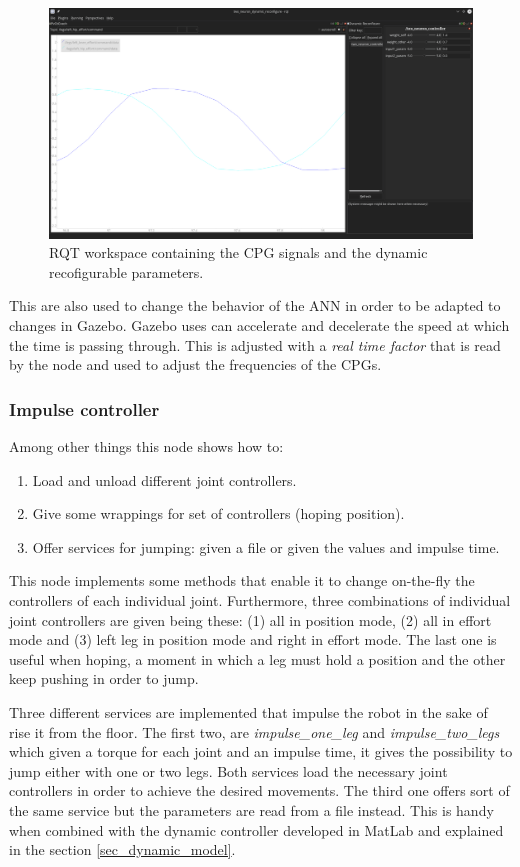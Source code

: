 \begin{figure}[tb]
    \centering
    \includegraphics[width=\textwidth]{figures/rqt_interface}
    \caption{RQT workspace containing the CPG signals and the dynamic recofigurable parameters.}
    \label{fig:rqt_interface}
\end{figure}

This are also used to change the behavior of the ANN in order to be adapted to changes in Gazebo.
Gazebo uses can accelerate and decelerate the speed at which the time is passing through.
This is adjusted with a \textit{real time factor} that is read by the node and used to adjust the frequencies of the CPGs.

\subsubsection{Impulse controller} %
\label{ssub:impulse_controller}
Among other things this node shows how to:
\begin{enumerate}
    \item Load and unload different joint controllers.
    \item Give some wrappings for set of controllers (hoping position).
    \item Offer services for jumping: given a file or given the values and impulse time.
\end{enumerate}
This node implements some methods that enable it to change on-the-fly the controllers of each individual joint.
Furthermore, three combinations of individual joint controllers are given being these: (1) all in position mode, (2) all in effort mode and (3) left leg in position mode and right in effort mode.
The last one is useful when hoping, a moment in which a leg must hold a position and the other keep pushing in order to jump.

Three different services are implemented that impulse the robot in the sake of rise it from the floor.
The first two, are \textit{impulse\_one\_leg} and \textit{impulse\_two\_legs} which given a torque for each joint and an impulse time, it gives the possibility to jump either with one or two legs.
Both services load the necessary joint controllers in order to achieve the desired movements.
The third one offers sort of the same service but the parameters are read from a file instead.
This is handy when combined with the dynamic controller developed in MatLab and explained in the section \ref{sec_dynamic_model}.

